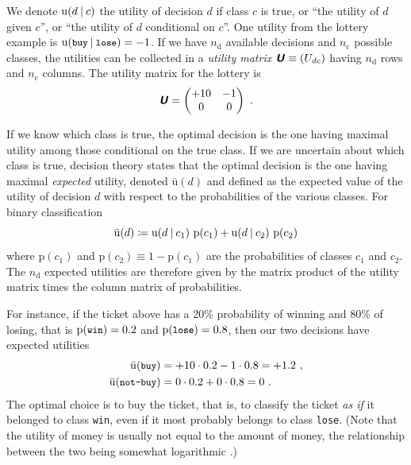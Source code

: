 \documentclass[\ifafour a4paper,12pt,\else a5paper,10pt,\fi%
onecolumn,oneside,article,%
british%
]{memoir}
\theoremstyle{remark}
\theoremstyle{innote}
\newcommand*{\mathte}[1]{\textbf{\textit{\textsf{#1}}}}
\newcommand*{\defd}{\coloneqq}
\newcommand*{\p}{\mathrm{p}}%
\renewcommand*{\|}[1][]{\nonscript\:#1\vert\nonscript\:\mathopen{}}
\newcommand*{\chap}{ch.}%
\newcommand*{\eg}{{e.g.}}
\newcommand*{\U}{\mathrm{u}}
\newcommand*{\eu}{\bar{\U}}
\newcommand*{\nd}{n_{\textrm{d}}}
\newcommand*{\nc}{n_{\textrm{c}}}
\begin{document}
We denote $\U(d\|c)$ the utility of decision $d$ if class $c$ is true, or  \enquote{the utility of $d$ given $c$}, or \enquote{the utility of $d$ conditional on $c$}. One utility from the lottery example is $\U(\texttt{\small buy} \| \texttt{\small lose}) = -1$. If we have $\nd$ available decisions and $\nc$ possible classes, the utilities can be collected in a \emph{utility matrix} $\mathte{U} \equiv (U_{dc})$ having $\nd$ rows and $\nc$ columns. The utility matrix for the lottery is
\begin{equation}
  \label{eq:utmatr_lottery}
  \mathte{U} =
  \begin{pmatrix}
    +10 & -1 \\ 0 & 0
  \end{pmatrix} \ .
\end{equation}

If we know which class is true, the optimal decision is the one having maximal utility among those conditional on the true class. If we are uncertain about which class is true, decision theory states that the optimal decision is the one having maximal \emph{expected} utility, denoted $\eu(d)$ and defined as the expected value of the utility of decision $d$ with respect to the probabilities of the various classes. For binary classification
\begin{equation}
  \label{eq:exp_utility}
  \eu(d) \defd \U(d \| c_{1})\ \p(c_{1}) + \U(d \| c_{2})\ \p(c_{2})
\end{equation}
where $\p(c_{1})$ and $\p(c_{2}) \equiv 1 - \p(c_{1})$ are the probabilities of classes $c_{1}$ and $c_{2}$. The $\nd$ expected utilities are therefore given by the matrix product of the utility matrix times the column matrix of probabilities.

For instance, if the ticket above has a 20\% probability of winning and 80\% of losing, that is $\p(\texttt{\small win}) = 0.2$ and $\p(\texttt{\small lose}) = 0.8$, then our two decisions have expected utilities
\begin{equation}
  \label{eq:exp_utilities_lottery}
  \begin{aligned}
    \eu(\texttt{\small buy}) &= +10\cdot 0.2 - 1\cdot 0.8 = +1.2 \ ,\\
    \eu(\texttt{\small not-buy}) &= 0\cdot 0.2 + 0\cdot 0.8 = 0 \ .
  \end{aligned}
\end{equation}
The optimal choice is to buy the ticket, that is, to classify the ticket \emph{as if} it belonged to class \texttt{win}, even if it most probably belongs to class \texttt{lose}. (Note that the utility of money is usually not equal to the amount of money, the relationship between the two being somewhat logarithmic \autocites[\eg][pp.~203--204]{north1968}[\chap~4]{raiffa1968_r1970}.)
\end{document}
